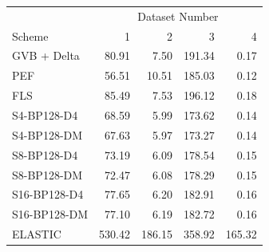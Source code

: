 \begin{tabular}{lrrrr}
\toprule
 & \multicolumn{4}{c}{Dataset Number} \\
Scheme & 1 & 2 & 3 & 4 \\
\midrule
GVB + Delta & 80.91 & 7.50 & 191.34 & 0.17 \\
PEF & 56.51 & 10.51 & 185.03 & 0.12 \\
FLS & 85.49 & 7.53 & 196.12 & 0.18 \\
S4-BP128-D4 & 68.59 & 5.99 & 173.62 & 0.14 \\
S4-BP128-DM & 67.63 & 5.97 & 173.27 & 0.14 \\
S8-BP128-D4 & 73.19 & 6.09 & 178.54 & 0.15 \\
S8-BP128-DM & 72.47 & 6.08 & 178.29 & 0.15 \\
S16-BP128-D4 & 77.65 & 6.20 & 182.91 & 0.16 \\
S16-BP128-DM & 77.10 & 6.19 & 182.72 & 0.16 \\
ELASTIC & 530.42 & 186.15 & 358.92 & 165.32 \\
\bottomrule
\end{tabular}
